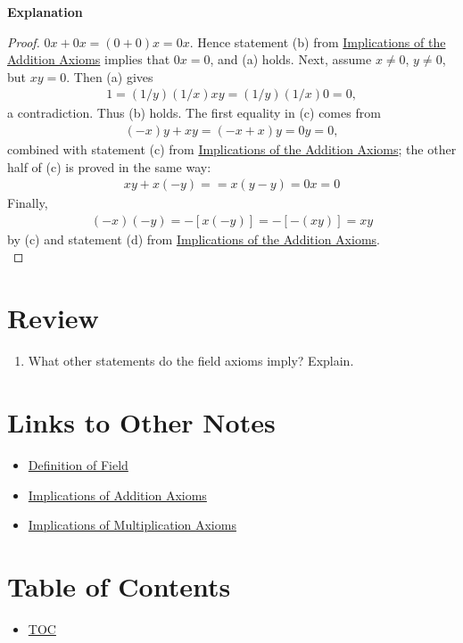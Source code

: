 \textbf{Explanation}\\
\begin{proof}
  $0x + 0x = (0 + 0)x = 0x$. Hence statement (b) from \hyperref[202501150717]{Implications of the Addition Axioms} implies that $0x = 0$, and (a) holds. Next, assume $x \neq 0$, $y \neq 0$, but $xy = 0$. Then (a) gives
  \begin{align*}
    1 = (1/y)(1/x)xy = (1/y)(1/x)0 = 0,
  \end{align*}
  a contradiction. Thus (b) holds. The first equality in (c) comes from 
  \begin{align*}
    (-x)y + xy = (-x + x)y = 0y = 0,
  \end{align*}
  combined with statement (c) from \hyperref[202501150717]{Implications of the Addition Axioms}; the other half of (c) is proved in the same way:
  \begin{align*}
    xy + x(-y) = = x(y - y) = 0x = 0
  \end{align*}
  Finally,
  \begin{align*}
    (-x)(-y) = -[x(-y)] = -[-(xy)] = xy
  \end{align*}
  by (c) and statement (d) from \hyperref[202501150717]{Implications of the Addition Axioms}.\\
\end{proof}


\section*{Review}
\begin{enumerate}
  \item What other statements do the field axioms imply? Explain.
\end{enumerate}


\section*{Links to Other Notes}
\begin{itemize}
  \item \hyperref[202501150657]{Definition of Field}
  \item \hyperref[202501150717]{Implications of Addition Axioms}
  \item \hyperref[202501150809]{Implications of Multiplication Axioms}
\end{itemize}

\section*{Table of Contents}

\begin{itemize}
  \item \hyperref[toc]{TOC}
\end{itemize}

